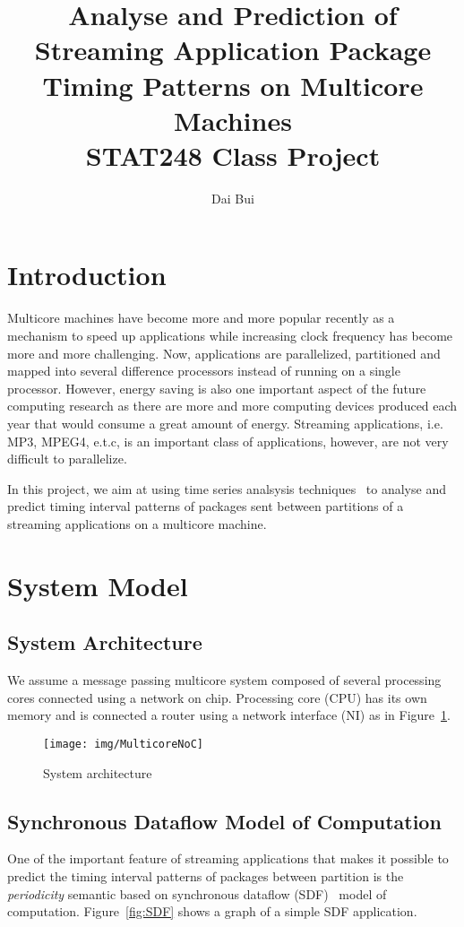 \documentclass[12pt]{article}
\begin{document}
\title{Analyse and Prediction of Streaming
Application Package Timing Patterns on Multicore Machines\\
STAT248 Class Project}
\author{Dai Bui}
\maketitle
\section{Introduction}
Multicore machines have become more and more popular recently as a mechanism to
speed up applications while increasing clock frequency has become more and more
challenging. Now, applications are parallelized, partitioned and mapped into
several difference processors instead of running on a single processor. However, energy
saving is also one important aspect of the future computing research as there
are more and more computing devices produced each year that would consume a great
amount of energy. Streaming applications, i.e. MP3, MPEG4, e.t.c, is an
important class of applications, however, are not very difficult to parallelize.

In this project, we aim at using time series analsysis
techniques~\cite{BrillingerTimeSeries, ShumwayTimeSeries} to analyse and predict
timing interval patterns of packages sent between partitions of a streaming
applications on a multicore machine.

\section{System Model}
\subsection{System Architecture}
We assume a message passing multicore system composed of several processing
cores connected using a network on chip. Processing core (CPU) has its own
memory and is connected a router using a network interface (NI) as in
Figure~\ref{fig:MulticoreNoC}.

\begin{figure}[ht!]
\centering
\texttt{[image: img/MulticoreNoC]}
\caption{System architecture}\label{fig:MulticoreNoC}
\end{figure}

\subsection{Synchronous Dataflow Model of Computation}
One of the important feature of streaming applications that makes it possible to
predict the timing interval patterns of packages between partition is the
\textit{periodicity} semantic based on synchronous dataflow (SDF)~\cite{LeeSDF}
model of computation. Figure~\ref{fig:SDF} shows a graph of a simple SDF
application.
\end{document}
